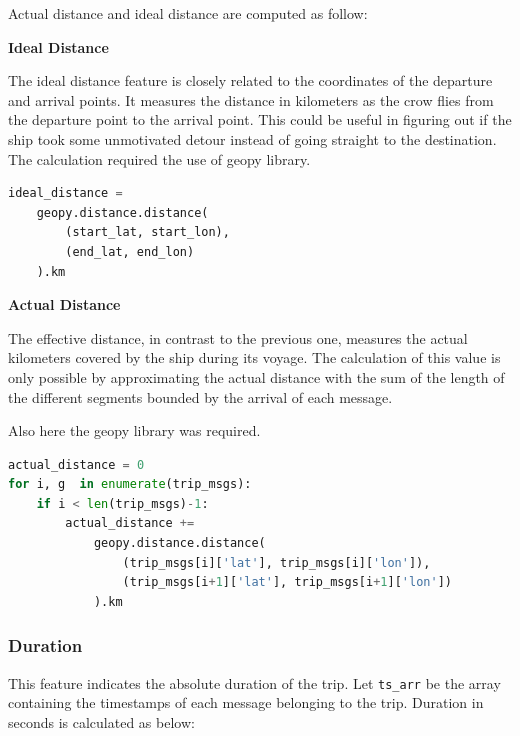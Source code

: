     Actual distance and ideal distance are computed as follow:
    
    \textbf{Ideal Distance}
    
    The ideal distance feature is closely related to the coordinates of the departure and arrival points. It measures the distance in kilometers as the crow flies from the departure point to the arrival point. This could be useful in figuring out if the ship took some unmotivated detour instead of going straight to the destination.
    \\
    The calculation required the use of geopy \cite{geopy} library.
    
    \begin{minipage}{\linewidth}
    \begin{lstlisting}[language=Python]
ideal_distance =
    geopy.distance.distance(
        (start_lat, start_lon),
        (end_lat, end_lon)
    ).km
    \end{lstlisting} 
    \end{minipage}

    
    \textbf{Actual Distance}
    
    The effective distance, in contrast to the previous one, measures the actual kilometers covered by the ship during its voyage. The calculation of this value is only possible by approximating the actual distance with the sum of the length of the different segments bounded by the arrival of each message.
    
    Also here the geopy \cite{geopy} library was required.
        
    \begin{lstlisting}[language=Python]
actual_distance = 0
for i, g  in enumerate(trip_msgs):
    if i < len(trip_msgs)-1:
        actual_distance += 
            geopy.distance.distance(
                (trip_msgs[i]['lat'], trip_msgs[i]['lon']),
                (trip_msgs[i+1]['lat'], trip_msgs[i+1]['lon'])
            ).km
    \end{lstlisting}
    
    \subsubsection{Duration}

    This feature indicates the absolute duration of the trip.
    Let \verb|ts_arr| be the array containing the timestamps of each message belonging to the trip. Duration in seconds is calculated as below:
    
